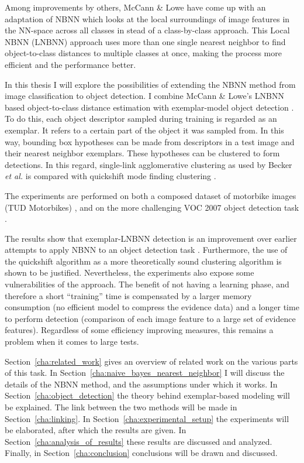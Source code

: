 Among improvements by others, McCann \& Lowe \cite{mccann2012local} have come up with an adaptation of NBNN which looks at the local surroundings of image features in the NN-space across all classes in stead of a class-by-class approach. This Local NBNN (LNBNN) approach uses more than one single nearest neighbor to find object-to-class distances to multiple classes at once, making the process more efficient and the performance better. 

In this thesis I will explore the possibilities of extending the NBNN method from image classification to object detection. I combine McCann \& Lowe's LNBNN based object-to-class distance estimation with exemplar-model object detection \cite{becker2012codebook, chum2007exemplar}. To do this, each object descriptor sampled during training is regarded as an exemplar. It refers to a certain part of the object it was sampled from. In this way, bounding box hypotheses can be made from descriptors in a test image and their nearest neighbor exemplars. These hypotheses can be clustered to form detections. In this regard, single-link agglomerative clustering as used by Becker \emph{et al.} \cite{becker2012codebook} is compared with quickshift mode finding clustering \cite{vedaldi2008quick}.

The experiments are performed on both a composed dataset of motorbike images (TUD Motorbikes) \cite{becker2012codebook, fritz2005integrating}, and on the more challenging VOC 2007 object detection task \cite{pascal-voc-2007}.

The results show that exemplar-LNBNN detection is an improvement over earlier attempts to apply NBNN to an object detection task \cite{becker2012codebook}. Furthermore, the use of the quickshift algorithm as a more theoretically sound clustering algorithm is shown to be justified. Nevertheless, the experiments also expose some vulnerabilities of the approach. The benefit of not having a learning phase, and therefore a short ``training'' time is compensated by a larger memory consumption (no efficient model to compress the evidence data) and a longer time to perform detection (comparison of each image feature to a large set of evidence features). Regardless of some efficiency improving measures, this remains a problem when it comes to large tests.

Section~\ref{cha:related_work} gives an overview of related work on the various parts of this task. In Section~\ref{cha:naive_bayes_nearest_neighbor} I will discuss the details of the NBNN method, and the assumptions under which it works. In Section~\ref{cha:object_detection} the theory behind exemplar-based modeling will be explained. The link between the two methods will be made in Section~\ref{cha:linking}. In Section~\ref{cha:experimental_setup} the experiments will be elaborated, after which the results are given. In Section~\ref{cha:analysis_of_results} these results are discussed and analyzed. Finally, in Section~\ref{cha:conclusion} conclusions will be drawn and discussed.

